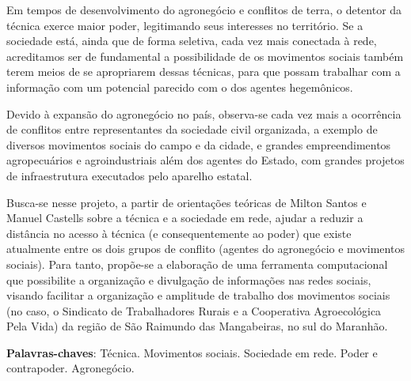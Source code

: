 \begin{resumoumacoluna}
Em tempos de desenvolvimento do agronegócio e conflitos de terra, o detentor da técnica exerce maior poder, legitimando seus interesses no território. Se a sociedade está, ainda que de forma seletiva, cada vez mais conectada à rede, acreditamos ser de fundamental a possibilidade de os movimentos sociais também terem meios de se apropriarem dessas técnicas, para que possam trabalhar com a informação com um potencial parecido com o dos agentes hegemônicos.

Devido à expansão do agronegócio no país, observa-se cada vez mais a ocorrência de  conflitos entre representantes da sociedade civil organizada, a exemplo de diversos movimentos sociais do campo e da cidade, e grandes empreendimentos agropecuários e agroindustriais além dos agentes do Estado, com  grandes projetos de infraestrutura executados pelo aparelho estatal.

Busca-se nesse projeto, a partir de orientações teóricas de Milton Santos e Manuel Castells sobre a técnica e a sociedade em rede, ajudar a reduzir a distância no acesso à técnica (e consequentemente ao poder) que existe atualmente entre os dois grupos de conflito (agentes do agronegócio e movimentos sociais). Para tanto, propõe-se a elaboração de uma ferramenta computacional que possibilite a organização e divulgação de informações nas redes sociais, visando facilitar a organização e amplitude de trabalho dos movimentos sociais (no caso, o Sindicato de Trabalhadores Rurais e a Cooperativa Agroecológica Pela Vida) da região de São Raimundo das Mangabeiras, no sul do Maranhão.

 \vspace{\onelineskip}
 \noindent
 \textbf{Palavras-chaves}: Técnica. Movimentos sociais. Sociedade em rede. Poder e contrapoder. Agronegócio.
\end{resumoumacoluna}

